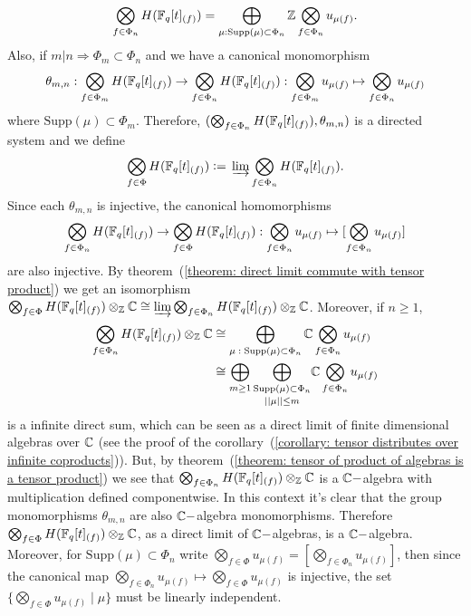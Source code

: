 \begin{equation}
    \bigotimes_{f\in\Phi_n}H(\mathbb{F}_q[t]_{(f)})=\bigoplus_{\mu:\text{Supp}(\mu)\subset \Phi_n}\mathbb{Z}\bigotimes_{f\in\Phi_n}u_{\mu(f)}.
\end{equation}
Also, if $m|n\Rightarrow \Phi_m\subset \Phi_n$ and we have a canonical monomorphism
\begin{equation}
    \theta_{m,n}: \bigotimes_{f\in\Phi_m}H(\mathbb{F}_q[t]_{(f)})\rightarrow  \bigotimes_{f\in\Phi_n}H(\mathbb{F}_q[t]_{(f)}) : \bigotimes_{f\in\Phi_m}u_{\mu(f)} \mapsto \bigotimes_{f\in\Phi_n}u_{\mu(f)}
\end{equation}
where $\text{Supp}(\mu)\subset \Phi_m$. Therefore, $(\bigotimes_{f\in\Phi_n}H(\mathbb{F}_q[t]_{(f)}),\theta_{m,n})$ is a directed system and we define 
\begin{equation}
    \bigotimes_{f\in\Phi}H(\fq[t]_{(f)})\bydef\varinjlim \bigotimes_{f\in\Phi_n}H(\fq[t]_{(f)}).
\end{equation}
Since each $\theta_{m,n}$ is injective, the canonical homomorphisms 
\begin{equation}
   \bigotimes_{f\in\Phi_n}H(\mathbb{F}_q[t]_{(f)})\rightarrow \bigotimes_{f\in\Phi}H(\mathbb{F}_q[t]_{(f)}): \bigotimes_{f\in\Phi_n}u_{\mu(f)}\mapsto [\bigotimes_{f\in\Phi_n}u_{\mu(f)}]
\end{equation}
are also injective. By theorem~(\ref{theorem: direct limit commute with tensor product}) we get an isomorphism $ \bigotimes_{f\in\Phi}H(\mathbb{F}_q[t]_{(f)})\otimes_{\mathbb{Z}}\mathbb{C}\cong\varinjlim  \bigotimes_{f\in\Phi_n}H(\mathbb{F}_q[t]_{(f)})\otimes_{\mathbb{Z}}\mathbb{C}$. Moreover, if $n\geq1$,
\begin{equation}
\begin{split}
     \bigotimes_{f\in\Phi_n}H(\mathbb{F}_q[t]_{(f)})\otimes_{\mathbb{Z}}\mathbb{C}&\cong \bigoplus_{\mu\;:\;\text{Supp}(\mu)\subset\Phi_n}\mathbb{C}\bigotimes_{f\in\Phi_n}u_{\mu(f)}\\
     &\cong \bigoplus_{m\geq1}\underset{||\mu||\leq m}{\bigoplus_{\text{Supp}(\mu)\subset\Phi_n}}\mathbb{C}\bigotimes_{f\in\Phi_n}u_{\mu(f)}
\end{split}
\end{equation}
is a infinite direct sum, which can be seen as a direct limit of finite dimensional algebras over $\mathbb{C}$ (see the proof of the corollary~(\ref{corollary: tensor distributes over infinite coproducts})). But, by theorem~(\ref{theorem: tensor of product of algebras is a tensor product}) we see that $  \bigotimes_{f\in\Phi_n}H(\mathbb{F}_q[t]_{(f)})\otimes_{\mathbb{Z}}\mathbb{C}$ is a $\mathbb{C}-$algebra with multiplication defined componentwise. In this context it's clear that the group monomorphisms $\theta_{m,n}$ are also $\mathbb{C}-$algebra monomorphisms. Therefore $\bigotimes_{f\in\Phi}H(\mathbb{F}_q[t]_{(f)})\otimes_{\mathbb{Z}}\mathbb{C}$, as a direct limit of $\mathbb{C}-$algebras, is a $\mathbb{C}-$algebra. Moreover, for $\text{Supp}(\mu)\subset\Phi_n$ write $\bigotimes_{f\in\Phi}u_{\mu(f)}=[\bigotimes_{f\in\Phi_n}u_{\mu(f)}]$, then since the canonical map $\bigotimes_{f\in\Phi_n}u_{\mu(f)}\mapsto \bigotimes_{f\in\Phi}u_{\mu(f)}$ is injective, the set $\{\bigotimes_{f\in\Phi}u_{\mu(f)}\;|\;\mu\}$ must be linearly independent.\par
